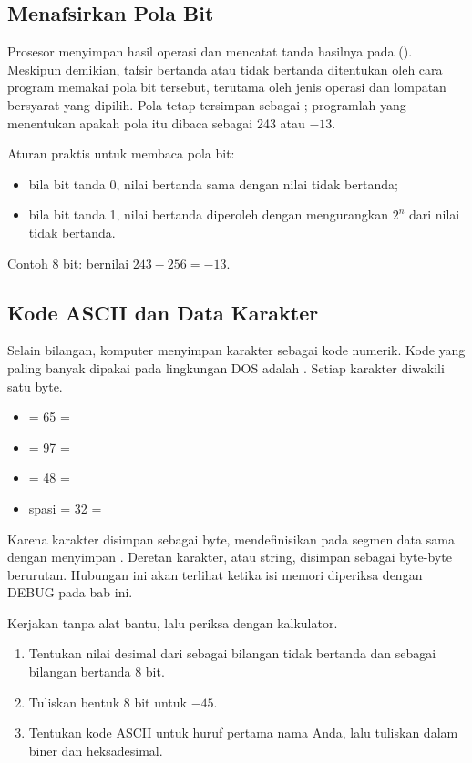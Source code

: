 \subsection{Menafsirkan Pola Bit}

Prosesor menyimpan hasil operasi dan mencatat tanda hasilnya pada
 (). Meskipun demikian, tafsir bertanda atau
tidak bertanda ditentukan oleh cara program memakai pola bit tersebut,
terutama oleh jenis operasi dan lompatan bersyarat yang dipilih.
Pola  tetap tersimpan sebagai ; programlah yang
menentukan apakah pola itu dibaca sebagai 243 atau $-13$.

\begin{infobox}
\vspace{1.1em}
Aturan praktis untuk membaca pola bit:
\begin{itemize}
    \item bila bit tanda 0, nilai bertanda sama dengan nilai tidak
          bertanda;
    \item bila bit tanda 1, nilai bertanda diperoleh dengan
          mengurangkan $2^n$ dari nilai tidak bertanda.
\end{itemize}
Contoh 8 bit:  bernilai $243 - 256 = -13$.
\end{infobox}

\subsection{Kode ASCII dan Data Karakter}

Selain bilangan, komputer menyimpan karakter sebagai kode numerik.
Kode yang paling banyak dipakai pada lingkungan DOS adalah
. Setiap karakter diwakili satu byte.

\begin{itemize}
    \item {} = 65 = 
    \item {} = 97 = 
    \item {} = 48 = 
    \item spasi = 32 = 
\end{itemize}

Karena karakter disimpan sebagai byte, mendefinisikan  pada
segmen data sama dengan menyimpan . Deretan karakter, atau
string, disimpan sebagai byte-byte berurutan. Hubungan ini akan
terlihat ketika isi memori diperiksa dengan DEBUG pada bab ini.

\begin{aktivitasbox}
\vspace{1.1em}
Kerjakan tanpa alat bantu, lalu periksa dengan kalkulator.
\begin{enumerate}
    \item Tentukan nilai desimal dari  sebagai bilangan
          tidak bertanda dan sebagai bilangan bertanda 8 bit.
    \item Tuliskan bentuk  8 bit untuk $-45$.
    \item Tentukan kode ASCII untuk huruf pertama nama Anda, lalu
          tuliskan dalam biner dan heksadesimal.
\end{enumerate}
\end{aktivitasbox}
